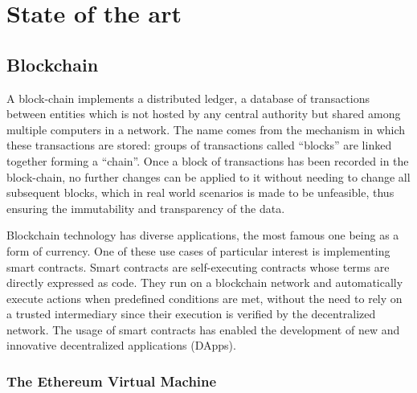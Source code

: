 \chapter{State of the art}
\label{cap:state-of-the-art}


\section{Blockchain}

A block-chain implements a distributed ledger, a database of transactions
between entities which is not hosted by any central authority but shared
among multiple computers in a network. The name comes from the mechanism
in which these transactions are stored: groups of transactions called
``blocks'' are linked together forming a ``chain''. Once a block of 
transactions has been recorded in the block-chain, no further changes can
be applied to it without needing to change all subsequent blocks, which in
real world scenarios is made to be unfeasible, thus ensuring the immutability
and transparency of the data.


Blockchain technology has diverse applications, the most famous one being
as a form of currency. One of these use cases of particular interest is 
implementing smart contracts. Smart contracts are self-executing contracts
whose terms are directly expressed as code. They run on a blockchain 
network and automatically execute actions when predefined conditions are
met, without the need to rely on a trusted intermediary since their
execution is verified by the decentralized network. The usage of smart
contracts has enabled the development of new and innovative decentralized
applications (DApps).

\subsection{The Ethereum Virtual Machine}

